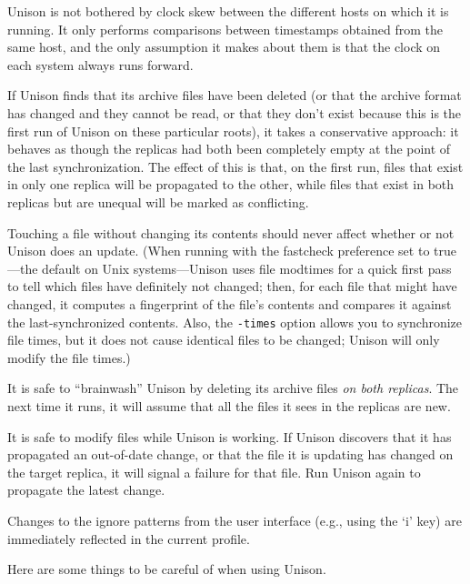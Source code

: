 \documentclass{article}
\begin{document}
Unison is not bothered by clock skew between the different hosts on
which it is running.  It only performs comparisons between timestamps
obtained from the same host, and the only assumption it makes about
them is that the clock on each system always runs forward.

If Unison finds that its archive files have been deleted (or that the
archive format has changed and they cannot be read, or that they don't
exist because this is the first run of Unison on these particular
roots), it takes a conservative approach: it behaves as though the
replicas had both been completely empty at the point of the last
synchronization.  The effect of this is that, on the first run, files
that exist in only one replica will be propagated to the other, while
files that exist in both replicas but are unequal will be marked as
conflicting.

Touching a file without changing its contents should never affect whether or
not Unison does an update. (When running with the fastcheck preference set
to true---the default on Unix systems---Unison uses file modtimes for a
quick first pass to tell which files have definitely not changed; then, for
each file that might have changed, it computes a fingerprint of the file's
contents and compares it against the last-synchronized contents. Also, the
\verb|-times| option allows you to synchronize file times, but it does not
cause identical files to be changed; Unison will only modify the file
times.)

It is safe to ``brainwash'' Unison by deleting its archive files
{\em on both replicas}.  The next time it runs, it will assume that
all the files it sees in the replicas are new.

It is safe to modify files while Unison is working.  If Unison
discovers that it has propagated an out-of-date change, or that the
file it is updating has changed on the target replica, it will signal
a failure for that file.  Run Unison again to propagate the latest
change.

Changes to the ignore patterns from the user interface (e.g., using
the `i' key) are immediately reflected in the current profile.



Here are some things to be careful of when using Unison.
\end{document}
